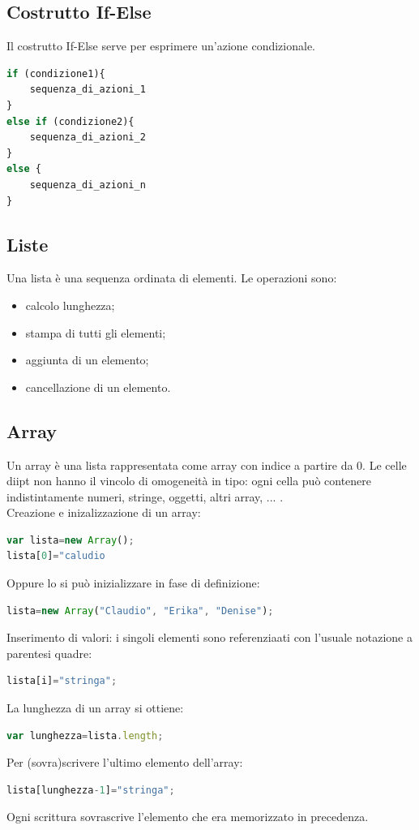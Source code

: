 \documentclass{article}
\begin{document}
\subsection{Costrutto If-Else}
Il costrutto If-Else serve per esprimere un'azione condizionale.
\begin{lstlisting}[language=JavaScript]
if (condizione1){
    sequenza_di_azioni_1
}
else if (condizione2){
    sequenza_di_azioni_2
}
else {
    sequenza_di_azioni_n
}
\end{lstlisting}
\subsection{Liste}
Una lista è una sequenza ordinata di elementi. Le operazioni sono:
\begin{itemize}
    \item calcolo lunghezza;
    \item stampa di tutti gli elementi;
    \item aggiunta di un elemento;
    \item cancellazione di un elemento.
\end{itemize}
\subsection{Array}
Un array è una lista rappresentata come array con indice a partire da 0.
Le celle diipt non hanno il vincolo di omogeneità in tipo: ogni cella può contenere indistintamente numeri, stringe, oggetti, altri array, ... .
\\ Creazione e inizalizzazione di un array:
\begin{lstlisting}[language=JavaScript]
var lista=new Array();
lista[0]="caludio
\end{lstlisting}
Oppure lo si può inizializzare in fase di definizione:
\begin{lstlisting}[language=JavaScript]
lista=new Array("Claudio", "Erika", "Denise");
\end{lstlisting}
Inserimento di valori: i singoli elementi sono referenziaati con l'usuale notazione a parentesi quadre:
\begin{lstlisting}[language=JavaScript]
lista[i]="stringa";
\end{lstlisting}
La lunghezza di un array si ottiene:
\begin{lstlisting}[language=JavaScript]
var lunghezza=lista.length;
\end{lstlisting}
Per (sovra)scrivere l'ultimo elemento dell'array:
\begin{lstlisting}[language=JavaScript]
lista[lunghezza-1]="stringa";
\end{lstlisting}
Ogni scrittura sovrascrive l'elemento che era memorizzato in precedenza.
\end{document}
